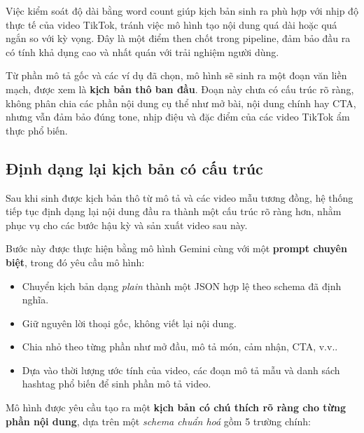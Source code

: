 Việc kiểm soát độ dài bằng word count giúp kịch bản sinh ra phù hợp với nhịp độ thực tế của video TikTok, tránh việc mô hình tạo nội dung quá dài hoặc quá ngắn so với kỳ vọng. Đây là một điểm then chốt trong pipeline, đảm bảo đầu ra có tính khả dụng cao và nhất quán với trải nghiệm người dùng.

Từ phần mô tả gốc và các ví dụ đã chọn, mô hình sẽ sinh ra một đoạn văn liền mạch, được xem là \textbf{kịch bản thô ban đầu}. Đoạn này chưa có cấu trúc rõ ràng, không phân chia các phần nội dung cụ thể như mở bài, nội dung chính hay CTA, nhưng vẫn đảm bảo đúng tone, nhịp điệu và đặc điểm của các video TikTok ẩm thực phổ biến.


\subsection{Định dạng lại kịch bản có cấu trúc}

Sau khi sinh được kịch bản thô từ mô tả và các video mẫu tương đồng, hệ thống tiếp tục định dạng lại nội dung đầu ra thành một cấu trúc rõ ràng hơn, nhằm phục vụ cho các bước hậu kỳ và sản xuất video sau này.

Bước này được thực hiện bằng mô hình Gemini cùng với một \textbf{prompt chuyên biệt}, trong đó yêu cầu mô hình:
\begin{itemize}
    \item Chuyển kịch bản dạng \textit{plain} thành một JSON hợp lệ theo schema đã định nghĩa.
    \item Giữ nguyên lời thoại gốc, không viết lại nội dung.
    \item Chia nhỏ theo từng phần như mở đầu, mô tả món, cảm nhận, CTA, v.v..
    \item Dựa vào thời lượng ước tính của video, các đoạn mô tả mẫu và danh sách hashtag phổ biến để sinh phần mô tả video.
\end{itemize}

Mô hình được yêu cầu tạo ra một \textbf{kịch bản có chú thích rõ ràng cho từng phần nội dung}, dựa trên một \textit{schema chuẩn hoá} gồm 5 trường chính:

